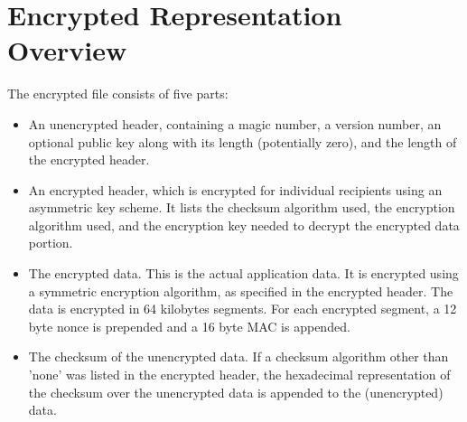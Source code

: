 \section{Encrypted Representation Overview}
The encrypted file consists of five parts:

\begin{itemize}
\item An unencrypted header, containing a magic number, a version number, an optional public key along with its length (potentially zero), and the length of the encrypted header.
%
\item An encrypted header, which is encrypted for individual recipients using an asymmetric key scheme. 
%
It lists the checksum algorithm used, the encryption algorithm used, and the encryption key needed to decrypt the encrypted data portion.
%
\item The encrypted data.
% 
This is the actual application data.
%
It is encrypted using a symmetric encryption algorithm, as specified in the encrypted header.
%
The data is encrypted in 64 kilobytes segments. For each encrypted segment, a 12 byte nonce is prepended and a 16 byte MAC is appended.
%
\item The checksum of the unencrypted data. If a checksum algorithm other than 'none' was listed in the encrypted header, the hexadecimal representation of the checksum over the unencrypted data is appended to the (unencrypted) data.
\end{itemize}
